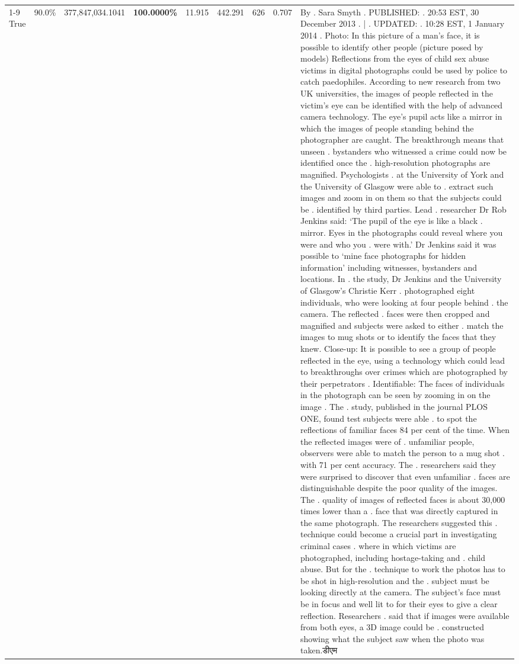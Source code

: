 \begin{table}[H]
\begin{tabular}{lllrlllll}
\cline{1-9}
True & 90.0\% & 377,847,034.1041 & \bfseries \color{red} 100.0000\% & 11.915 & 442.291 & 626 & 0.707 & By . Sara Smyth . PUBLISHED: . 20:53 EST, 30 December 2013 . | . UPDATED: . 10:28 EST, 1 January 2014 . Photo: In this picture of a man's face, it is possible to identify other people (picture posed by models) Reflections from the eyes of child sex abuse victims in digital photographs could be used by police to catch paedophiles. According to new research from two UK universities, the images of people reflected in the victim's eye can be identified with the help of advanced camera technology. The eye's pupil acts like a mirror in which the images of people standing behind the photographer are caught. The breakthrough means that unseen . bystanders who witnessed a crime could now be identified once the . high-resolution photographs are magnified. Psychologists . at the University of York and the University of Glasgow were able to . extract such images and zoom in on them so that the subjects could be . identified by third parties. Lead . researcher Dr Rob Jenkins said: ‘The pupil of the eye is like a black . mirror. Eyes in the photographs could reveal where you were and who you . were with.' Dr Jenkins said it was possible to ‘mine face photographs for hidden information' including witnesses, bystanders and locations. In . the study, Dr Jenkins and the University of Glasgow's Christie Kerr . photographed eight individuals, who were looking at four people behind . the camera. The reflected . faces were then cropped and magnified and subjects were asked to either . match the images to mug shots or to identify the faces that they knew. Close-up: It is possible to see a group of people reflected in the eye, using a technology which could lead to breakthroughs over crimes which are photographed by their perpetrators . Identifiable: The faces of individuals in the photograph can be seen by zooming in on the image . The . study, published in the journal PLOS ONE, found test subjects were able . to spot the reflections of familiar faces 84 per cent of the time. When the reflected images were of . unfamiliar people, observers were able to match the person to a mug shot . with 71 per cent accuracy. The . researchers said they were surprised to discover that even unfamiliar . faces are distinguishable despite the poor quality of the images. The . quality of images of reflected faces is about 30,000 times lower than a . face that was directly captured in the same photograph. The researchers suggested this . technique could become a crucial part in investigating criminal cases . where in which victims are photographed, including hostage-taking and . child abuse. But for the . technique to work the photos has to be shot in high-resolution and the . subject must be looking directly at the camera. The subject's face must be in focus and well lit to for their eyes to give a clear reflection. Researchers . said that if images were available from both eyes, a 3D image could be . constructed showing what the subject saw when the photo was taken.डीएम \\

\end{tabular}
\end{table}
